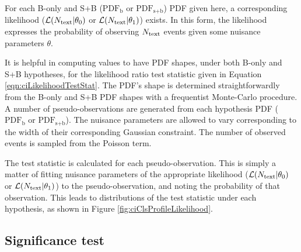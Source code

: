 For each B-only and S+B ($\text{PDF}_\text{b}$ or $\text{PDF}_\text{s+b}$) PDF given here, a corresponding likelihood ($\mathcal{L}(N_\mathrm{text}|\theta_0)$ or $\mathcal{L}(N_\mathrm{text}|\theta_1)$) exists.
In this form, the likelihood expresses the probability of observing $N_\mathrm{text}$ events given some nuisance parameters $\theta$.

It is helpful in computing \cls values to have PDF shapes, under both B-only and S+B hypotheses, for the likelihood ratio test statistic given in Equation \ref{eqn:ciLikelihoodTestStat}.
The PDF's shape is determined straightforwardly from the B-only and S+B PDF shapes with a frequentist Monte-Carlo procedure.
A number of pseudo-observations are generated from each hypothesis PDF ($\text{PDF}_\text{b}$ or $\text{PDF}_\text{s+b}$).
The nuisance parameters are allowed to vary corresponding to the width of their corresponding Gaussian constraint.
The number of observed events is sampled from the Poisson term.

The test statistic is calculated for each pseudo-observation.
This is simply a matter of fitting nuisance parameters of the appropriate likelihood ($\mathcal{L}(N_\mathrm{text}|\theta_0)$ or $\mathcal{L}(N_\mathrm{text}|\theta_1)$) to the pseudo-observation, and noting the probability of that observation.
This leads to distributions of the test statistic under each hypothesis, as shown in Figure \ref{fig:ciClsProfileLikelihood}.

\subsection{Significance test}\label{sec:ciSigTest}

